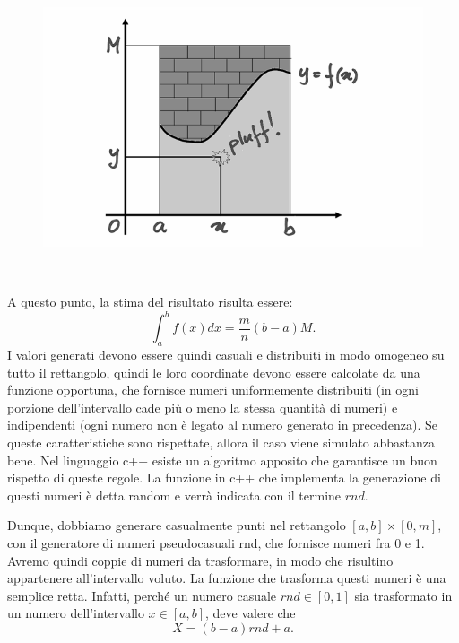 \documentclass{article}
\begin{document}
\begin{figure}[ht]
\centering
\includegraphics[scale=0.25]{img/09_06_pluff.png} 
\label{fig:Montecarlo}
\end{figure}\

A questo punto, la stima del risultato risulta essere: 
\[
\int_a^bf(x)dx=\frac{m}{n}(b-a)M.
\]
I valori generati devono essere quindi casuali e distribuiti in modo omogeneo su tutto il rettangolo, quindi le loro coordinate devono essere calcolate da una funzione opportuna, che fornisce numeri uniformemente distribuiti (in ogni porzione dell’intervallo cade più o meno la stessa quantità di numeri) e indipendenti (ogni numero non è legato al numero generato in precedenza). Se queste caratteristiche sono rispettate, allora il caso viene simulato abbastanza bene. Nel linguaggio c++ esiste un algoritmo apposito che garantisce un buon rispetto di queste regole. La funzione in c++ che implementa la generazione di questi numeri è detta random e verrà indicata con il termine $\mathit{rnd}$.

Dunque, dobbiamo generare casualmente punti nel rettangolo $[a,b]\times[0,m]$, con il generatore di numeri pseudocasuali rnd, che fornisce numeri fra 0 e 1. Avremo quindi coppie di numeri da trasformare, in modo che risultino appartenere all’intervallo voluto. La funzione che trasforma questi numeri è una semplice retta. Infatti, perché un numero casuale $\mathit{rnd} \in [0,1]$ sia trasformato in un numero dell’intervallo  $x\in[a,b]$, deve valere che
\[
X=(b-a)\mathit{rnd}+a.\]
\end{document}

